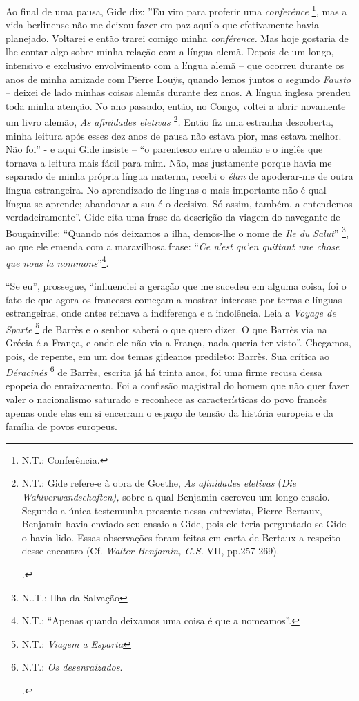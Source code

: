 Ao final de uma pausa, Gide diz: ''Eu vim para proferir uma
\emph{conferénce} \footnote{N.T.: Conferência.}\emph{,} mas a vida
berlinense não me deixou fazer em paz aquilo que efetivamente havia
planejado. Voltarei e então trarei comigo minha \emph{conférence.} Mas
hoje gostaria de lhe contar algo sobre minha relação com a língua alemã.
Depois de um longo, intensivo e exclusivo envolvimento com a língua
alemã -- que ocorreu durante os anos de minha amizade com Pierre Louÿs,
quando lemos juntos o segundo \emph{Fausto} -- deixei de lado minhas
coisas alemãs durante dez anos. A língua inglesa prendeu toda minha
atenção. No ano passado, então, no Congo, voltei a abrir novamente um
livro alemão, \emph{As afinidades eletivas} \footnote{N.T.: Gide
  refere-e à obra de Goethe, \emph{As afinidades eletivas} (\emph{Die
  Wahlverwandschaften),} sobre a qual Benjamin escreveu um longo ensaio.
  Segundo a única testemunha presente nessa entrevista, Pierre Bertaux,
  Benjamin havia enviado seu ensaio a Gide, pois ele teria perguntado se
  Gide o havia lido. Essas observações foram feitas em carta de Bertaux
  a respeito desse encontro (Cf. \emph{Walter Benjamin, G.S.} VII,
  pp.257-269).

  .}\emph{.} Então fiz uma estranha descoberta, minha leitura após esses
dez anos de pausa não estava pior, mas estava melhor. Não foi'' - e aqui
Gide insiste -- ``o parentesco entre o alemão e o inglês que tornava a
leitura mais fácil para mim. Não, mas justamente porque havia me
separado de minha própria língua materna, recebi o \emph{élan} de
apoderar-me de outra língua estrangeira. No aprendizado de línguas o
mais importante não é qual língua se aprende; abandonar a sua é o
decisivo. Só assim, também, a entendemos verdadeiramente''. Gide cita
uma frase da descrição da viagem do navegante de Bougainville: ``Quando
nós deixamos a ilha, demos-lhe o nome de \emph{Ile du} \emph{Salut}''
\footnote{N..T.: Ilha da Salvação}, ao que ele emenda com a maravilhosa
frase: ``\emph{Ce n'est qu'en quittant une chose que nous la
nommons}''\footnote{N.T.: ``Apenas quando deixamos uma coisa é que a
  nomeamos''.}.

``Se eu'', prossegue, ``influenciei a geração que me sucedeu em alguma
coisa, foi o fato de que agora os franceses começam a mostrar interesse
por terras e línguas estrangeiras, onde antes reinava a indiferença e a
indolência. Leia a \emph{Voyage de Sparte} \footnote{N.T.: \emph{Viagem
  a Esparta}} de Barrès e o senhor saberá o que quero dizer. O que
Barrès via na Grécia é a França, e onde ele não via a França, nada
queria ter visto''. Chegamos, pois, de repente, em um dos temas gideanos
predileto: Barrès. Sua crítica ao \emph{Déracinés} \footnote{N.T.:
  \emph{Os desenraizados}.

  .} de Barrès, escrita já há trinta anos, foi uma firme recusa dessa
epopeia do enraizamento. Foi a confissão magistral do homem que não quer
fazer valer o nacionalismo saturado e reconhece as características do
povo francês apenas onde elas em si encerram o espaço de tensão da
história europeia e da família de povos europeus.

